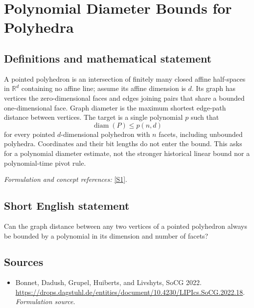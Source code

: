 \documentclass[11pt]{article}
\begin{document}
\section*{\texorpdfstring{Polynomial Diameter Bounds for Polyhedra}{Polynomial Diameter Bounds for Polyhedra}}\label{30001930}
\subsection{Definitions and mathematical statement}
A pointed polyhedron is an intersection of finitely many closed affine half-spaces in ${\mathbb{R}}^d$ containing no affine line; assume its affine dimension is $d$. Its graph has vertices the zero-dimensional faces and edges joining pairs that share a bounded one-dimensional face. Graph diameter is the maximum shortest edge-path distance between vertices. The target is a single polynomial $p$ such that
\[
 \operatorname{diam}(P)\le p(n,d)
\]
for every pointed $d$-dimensional polyhedron with $n$ facets, including unbounded polyhedra. Coordinates and their bit lengths do not enter the bound. This asks for a polynomial diameter estimate, not the stronger historical linear bound nor a polynomial-time pivot rule.
\par\smallskip\textit{Formulation and concept references:} \href{https://drops.dagstuhl.de/entities/document/10.4230/LIPIcs.SoCG.2022.18}{[S1]}.

\subsection{Short English statement}
Can the graph distance between any two vertices of a pointed polyhedron always be bounded by a polynomial in its dimension and number of facets?
\subsection{Sources}
\begin{itemize}
\item[S1]Bonnet, Dadush, Grupel, Huiberts, and Livshyts, SoCG 2022.
\url{https://drops.dagstuhl.de/entities/document/10.4230/LIPIcs.SoCG.2022.18}.
\textit{Formulation source.}
\end{itemize}
\end{document}
